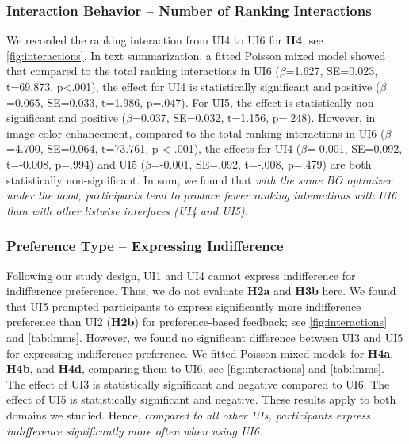 \documentclass[acmsmall,screen,nonacm]{acmart}
\begin{document}
\subsubsection{Interaction Behavior – Number of Ranking Interactions}
\label{sec:rankinginteractions}
We recorded the ranking interaction from UI4 to UI6 for \textbf{H4}, see \autoref{fig:interactions}.
%
In text summarization, a fitted Poisson mixed model showed that compared to the total ranking interactions in UI6 ($\beta$=1.627, SE=0.023, t=69.873, p<.001), the effect for UI4 is statistically significant and positive ($\beta$=0.065, SE=0.033, t=1.986, p=.047). For UI5, the effect is statistically non-significant
and positive ($\beta$=0.037, SE=0.032, t=1.156, p=.248). However, in image color enhancement, compared to the total ranking interactions in UI6 ($\beta$=4.700, SE=0.064, t=73.761, p < .001), the effects for UI4 ($\beta$=-0.001, SE=0.092, t=-0.008, p=.994) and UI5 ($\beta$=-0.001, SE=.092, t=-.008, p=.479) are both statistically non-significant.
%
In sum, we found that \emph{with the same BO optimizer under the hood, participants tend to produce fewer ranking interactions with UI6 than with other listwise interfaces (UI4 and UI5).}

\subsubsection{Preference Type – Expressing Indifference}
Following our study design, UI1 and UI4 cannot express indifference for indifference preference. Thus, we do not evaluate \textbf{H2a} and \textbf{H3b} here. We found that UI5 prompted participants to express significantly more indifference preference than UI2 (\textbf{H2b}) for preference-based feedback; see \autoref{fig:interactions} and \autoref{tab:lmms}. However, we found no significant difference between UI3 and UI5 for expressing indifference preference.
%
We fitted Poisson mixed models for \textbf{H4a}, \textbf{H4b}, and \textbf{H4d}, comparing them to UI6, see \autoref{fig:interactions} and \autoref{tab:lmms}. The effect of UI3 is statistically significant and negative compared to UI6. The effect of UI5 is statistically significant and negative. These results apply to both domains we studied. Hence, \emph{compared to all other UIs, participants express indifference significantly more often when using UI6}. 
\end{document}
